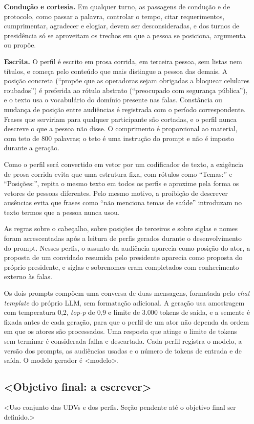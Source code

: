 \textbf{Condução e cortesia.} Em qualquer turno, as passagens de condução e de protocolo, como passar
a palavra, controlar o tempo, citar requerimentos, cumprimentar, agradecer e elogiar, devem ser
desconsideradas, e dos turnos de presidência só se aproveitam os trechos em que a pessoa se
posiciona, argumenta ou propõe.

\textbf{Escrita.} O perfil é escrito em prosa corrida, em terceira pessoa, sem listas nem títulos, e
começa pelo conteúdo que mais distingue a pessoa das demais. A posição concreta (``propõe que as
operadoras sejam obrigadas a bloquear celulares roubados'') é preferida ao rótulo abstrato
(``preocupado com segurança pública''), e o texto usa o vocabulário do domínio presente nas falas.
Constância ou mudança de posição entre audiências é registrada com o período correspondente. Frases
que serviriam para qualquer participante são cortadas, e o perfil nunca descreve o que a pessoa não
disse. O comprimento é proporcional ao material, com teto de 800 palavras; o teto é uma instrução
do prompt e não é imposto durante a geração.

Como o perfil será convertido em vetor por um codificador de texto, a exigência de prosa corrida
evita que uma estrutura fixa, com rótulos como ``Temas:'' e ``Posições:'', repita o mesmo texto em
todos os perfis e aproxime pela forma os vetores de pessoas diferentes. Pelo mesmo motivo, a
proibição de descrever ausências evita que frases como ``não menciona temas de saúde'' introduzam no
texto termos que a pessoa nunca usou.

As regras sobre o cabeçalho, sobre posições de terceiros e sobre siglas e nomes foram acrescentadas
após a leitura de perfis gerados durante o desenvolvimento do prompt. Nesses perfis, o assunto da
audiência aparecia como posição do ator, a proposta de um convidado resumida pelo presidente
aparecia como proposta do próprio presidente, e siglas e sobrenomes eram completados com
conhecimento externo às falas.

Os dois prompts compõem uma conversa de duas mensagens, formatada pelo \textit{chat template} do
próprio LLM, sem formatação adicional. A geração usa amostragem com temperatura 0,2, \textit{top-p} de 0,9 e limite de
3.000 tokens de saída, e a semente é fixada antes de cada geração, para que o perfil de um ator não
dependa da ordem em que os atores são processados. Uma resposta que atinge o limite de tokens sem
terminar é considerada falha e descartada. Cada perfil registra o modelo, a versão dos prompts, as
audiências usadas e o número de tokens de entrada e de saída. O modelo gerador é <modelo>.


\subsection{<Objetivo final: a escrever>}
\label{sec:metodo-objetivo}

<Uso conjunto das UDVs e dos perfis. Seção pendente até o objetivo final ser definido.>
